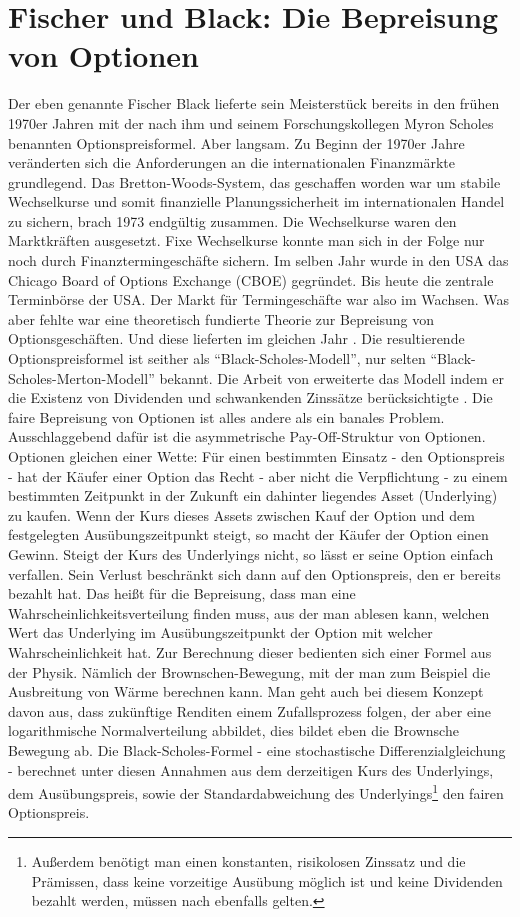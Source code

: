\section{Fischer und Black: Die Bepreisung von Optionen}
\label{Optionen}

Der eben genannte Fischer Black lieferte sein Meisterstück bereits in den frühen 1970er Jahren mit der nach ihm und seinem Forschungskollegen Myron Scholes benannten Optionspreisformel. Aber langsam. Zu Beginn der 1970er Jahre veränderten sich die Anforderungen an die internationalen Finanzmärkte grundlegend. Das Bretton-Woods-System, das geschaffen worden war um stabile Wechselkurse und somit finanzielle Planungssicherheit im internationalen Handel zu sichern, brach 1973 endgültig zusammen. Die Wechselkurse waren den Marktkräften ausgesetzt. Fixe Wechselkurse konnte man sich in der Folge nur noch durch Finanztermingeschäfte sichern. Im selben Jahr wurde in den USA das Chicago Board of Options Exchange (CBOE) gegründet. Bis heute die zentrale Terminbörse der USA. Der Markt für Termingeschäfte war also im Wachsen. Was aber fehlte war eine theoretisch fundierte Theorie zur Bepreisung von Optionsgeschäften. Und diese lieferten im gleichen Jahr \textcite{Black1973}. Die resultierende Optionspreisformel ist seither als "`Black-Scholes-Modell"', nur selten "`Black-Scholes-Merton-Modell"' bekannt. Die Arbeit von \textcite{Merton1973} erweiterte das Modell indem er die Existenz von Dividenden und schwankenden Zinssätze berücksichtigte \parencite{Scholes1997}.  Die faire Bepreisung von Optionen ist alles andere als ein banales Problem. Ausschlaggebend dafür ist die asymmetrische Pay-Off-Struktur von Optionen. Optionen gleichen einer Wette: Für einen bestimmten Einsatz - den Optionspreis - hat der Käufer einer Option das Recht - aber nicht die Verpflichtung - zu einem bestimmten Zeitpunkt in der Zukunft ein dahinter liegendes Asset (Underlying) zu kaufen. Wenn der Kurs dieses Assets zwischen Kauf der Option und dem festgelegten Ausübungszeitpunkt steigt, so macht der Käufer der Option einen Gewinn. Steigt der Kurs des Underlyings nicht, so lässt er seine Option einfach verfallen. Sein Verlust beschränkt sich dann auf den Optionspreis, den er bereits bezahlt hat.
Das heißt für die Bepreisung, dass man eine Wahrscheinlichkeitsverteilung finden muss, aus der man ablesen kann, welchen Wert das Underlying im Ausübungszeitpunkt der Option mit welcher Wahrscheinlichkeit hat. Zur Berechnung dieser bedienten sich \textcite{Black1973} einer Formel aus der Physik. Nämlich der Brownschen-Bewegung, mit der man zum Beispiel die Ausbreitung von Wärme berechnen kann. Man geht auch bei diesem Konzept davon aus, dass zukünftige Renditen einem Zufallsprozess folgen, der aber eine logarithmische Normalverteilung abbildet, dies bildet eben die Brownsche Bewegung ab. Die Black-Scholes-Formel - eine stochastische Differenzialgleichung - berechnet unter diesen Annahmen aus dem derzeitigen Kurs des Underlyings, dem Ausübungspreis, sowie der Standardabweichung des Underlyings\footnote{Außerdem benötigt man einen konstanten, risikolosen Zinssatz und die Prämissen, dass keine vorzeitige Ausübung möglich ist und keine Dividenden bezahlt werden, müssen nach \textcite{Black1973} ebenfalls gelten.} den fairen Optionspreis.
